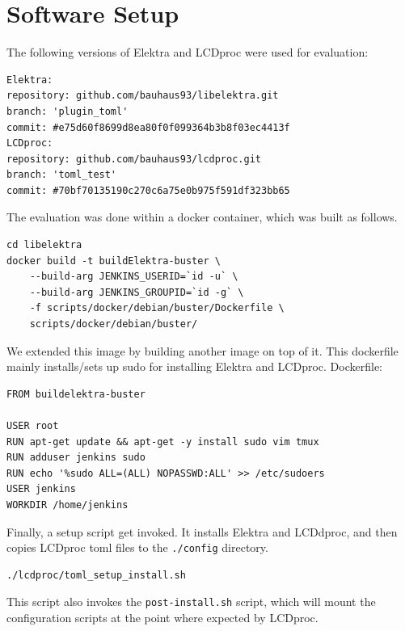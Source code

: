\documentclass[12pt]{report}
\begin{document}
\section{Software Setup}

The following versions of Elektra and LCDproc were used for evaluation:
\begin{tcolorbox}
\begin{verbatim}
Elektra:
repository: github.com/bauhaus93/libelektra.git
branch: 'plugin_toml'
commit: #e75d60f8699d8ea80f0f099364b3b8f03ec4413f
LCDproc:
repository: github.com/bauhaus93/lcdproc.git
branch: 'toml_test'
commit: #70bf70135190c270c6a75e0b975f591df323bb65
\end{verbatim}
\end{tcolorbox}


The evaluation was done within a docker container, which was built as follows.
\begin{tcolorbox}
\begin{verbatim}
cd libelektra
docker build -t buildElektra-buster \
    --build-arg JENKINS_USERID=`id -u` \
    --build-arg JENKINS_GROUPID=`id -g` \
    -f scripts/docker/debian/buster/Dockerfile \
    scripts/docker/debian/buster/
\end{verbatim}
\end{tcolorbox}

We extended this image by building another image on top of it. This dockerfile mainly installs/sets up sudo for installing Elektra and LCDproc.
Dockerfile:
\begin{tcolorbox}
\small
\begin{verbatim}
FROM buildelektra-buster

USER root
RUN apt-get update && apt-get -y install sudo vim tmux
RUN adduser jenkins sudo
RUN echo '%sudo ALL=(ALL) NOPASSWD:ALL' >> /etc/sudoers
USER jenkins
WORKDIR /home/jenkins
\end{verbatim}
\end{tcolorbox}

Finally, a setup script get invoked. It installs Elektra and LCDdproc, and then copies LCDproc \acrshort{toml} files to the \texttt{./config} directory.
\begin{tcolorbox}
\small
\begin{verbatim}
./lcdproc/toml_setup_install.sh
\end{verbatim}
\end{tcolorbox}
This script also invokes the \texttt{post-install.sh} script, which will mount the configuration scripts at the point where expected by LCDproc.
\end{document}
